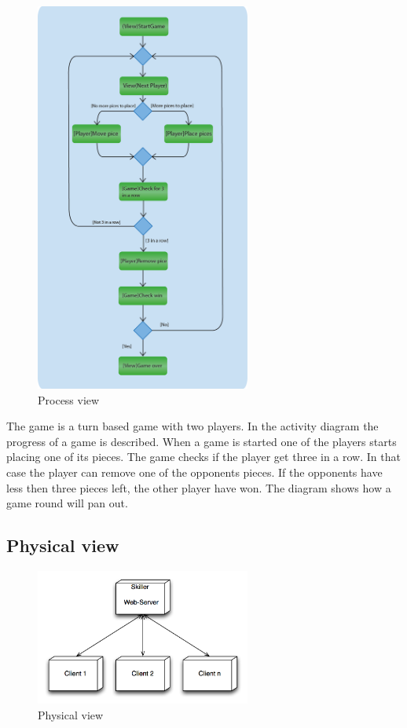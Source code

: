 \begin{figure}[H]
\begin{center}
\includegraphics[width=200pt]{./Images/ProcessView.png}
\end{center}
\caption{Process view}
\end{figure}

The game is a turn based game with two players. In the activity diagram the progress of a game is described. When a game is started one of the players starts placing one of its pieces. The game checks if the player get three in a row. In that case the player can remove one of the opponents pieces. If the opponents have less then three pieces left, the other player have won. The diagram shows how a game round will pan out. 

\subsection{Physical view}

\begin{figure}[H]
\begin{center}
\includegraphics[width=200pt]{./Images/physicalLayer1}
\end{center}
\caption{Physical view}
\end{figure}

